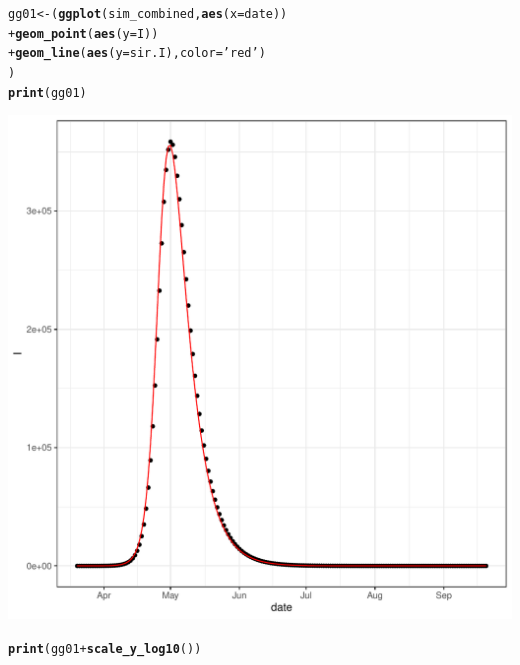\documentclass{article}\usepackage[]{graphicx}\usepackage[]{color}
\makeatletter
\def\maxwidth{ %
  \ifdim\Gin@nat@width>\linewidth
    \linewidth
  \else
    \Gin@nat@width
  \fi
}
\newcommand{\hlstr}[1]{\textcolor[rgb]{0.192,0.494,0.8}{#1}}%
\newcommand{\hlopt}[1]{\textcolor[rgb]{0,0,0}{#1}}%
\newcommand{\hlstd}[1]{\textcolor[rgb]{0.345,0.345,0.345}{#1}}%
\newcommand{\hlkwb}[1]{\textcolor[rgb]{0.69,0.353,0.396}{#1}}%
\newcommand{\hlkwc}[1]{\textcolor[rgb]{0.333,0.667,0.333}{#1}}%
\newcommand{\hlkwd}[1]{\textcolor[rgb]{0.737,0.353,0.396}{\textbf{#1}}}%
\newenvironment{kframe}{%
 \def\at@end@of@kframe{}%
 \ifinner\ifhmode%
  \def\at@end@of@kframe{\end{minipage}}%
  \begin{minipage}{\columnwidth}%
 \fi\fi%
 \def\FrameCommand##1{\hskip\@totalleftmargin \hskip-\fboxsep
 \colorbox{shadecolor}{##1}\hskip-\fboxsep
     \hskip-\linewidth \hskip-\@totalleftmargin \hskip\columnwidth}%
 \MakeFramed {\advance\hsize-\width
   \@totalleftmargin\z@ \linewidth\hsize
   \@setminipage}}%
 {\par\unskip\endMakeFramed%
 \at@end@of@kframe}
\newenvironment{knitrout}{}{} %
\makeatother
\begin{document}
\begin{knitrout}
\begin{kframe}
\begin{alltt}
\hlstd{gg01} \hlkwb{<-} \hlstd{(}\hlkwd{ggplot}\hlstd{(sim_combined,}\hlkwd{aes}\hlstd{(}\hlkwc{x}\hlstd{=date))}
\hlopt{+} \hlkwd{geom_point}\hlstd{(}\hlkwd{aes}\hlstd{(}\hlkwc{y}\hlstd{=I))}
\hlopt{+} \hlkwd{geom_line}\hlstd{(}\hlkwd{aes}\hlstd{(}\hlkwc{y}\hlstd{=sir.I),} \hlkwc{color}\hlstd{=}\hlstr{'red'}\hlstd{)}
\hlstd{)}
\hlkwd{print}\hlstd{(gg01)}
\end{alltt}
\end{kframe}
\includegraphics[width=\maxwidth]{figure/Try_MacPan_to_recover_the_SIR_result-2} 
\begin{kframe}\begin{alltt}
\hlkwd{print}\hlstd{(gg01} \hlopt{+} \hlkwd{scale_y_log10}\hlstd{())}
\end{alltt}
\end{kframe}

\end{knitrout}
\end{document}
